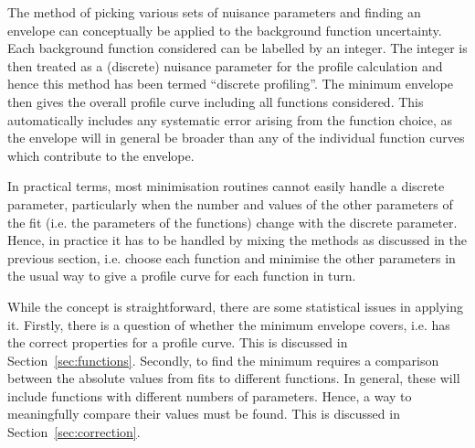 The method of picking various sets of nuisance parameters and finding
an envelope can conceptually be applied to the background function
uncertainty. Each background function considered can be labelled by an
integer. The integer is then treated as a (discrete) nuisance parameter
for the profile calculation and hence this method has been termed
``discrete profiling''.
The minimum envelope then gives the overall profile curve including
all functions considered. This automatically includes any systematic error
arising from the function choice, as the envelope will in general be broader
than any of the individual function curves which contribute to the envelope.

In practical terms, most minimisation routines 
cannot easily handle a discrete parameter, particularly when the
number and values of the other parameters of the fit (i.e. the parameters
of the functions) change with the discrete parameter.
Hence, in practice it has
to be handled by mixing the methods as discussed in the previous section,
i.e. choose each function and minimise
the other parameters in the usual way to give a profile curve for each function
in turn. 

While the concept is straightforward, there are some statistical
issues in applying it.
Firstly, there is a question of whether the \nll minimum envelope covers,
i.e. has the correct properties for a profile curve.
This is discussed in Section~\ref{sec:functions}.
Secondly, to find the minimum requires a
comparison between the absolute \nll values from fits to different functions.
In general, these will include functions with different numbers of parameters.
Hence, a way to meaningfully compare their \nll values must be found.
This is discussed in Section~\ref{sec:correction}.
